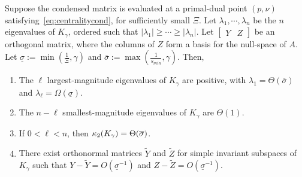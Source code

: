 \begin{theorem}
  \label{thm:cond}
  Suppose the condensed matrix is evaluated at a primal-dual
  point $(p, \nu)$ satisfying~\eqref{eq:centralitycond},
  for sufficiently small $\Xi$.
  Let $\lambda_1, \cdots, \lambda_n$ be the $n$ eigenvalues of
  $K_\gamma$, ordered such that $|\lambda_1| \geq  \cdots \geq |\lambda_n|$.
  Let $\begin{bmatrix} Y & Z \end{bmatrix}$ be an orthogonal
  matrix, where the columns of $Z$ form a basis for the null-space of
  $A$. Let $\underline{\sigma} :=\min\left(\frac{1}{\Xi}, \gamma\right)$
  and $\overline{\sigma} := \max\left(\frac{1}{s_{min}}, \gamma\right)$.
  Then,
  \begin{enumerate}
    \item[(i)] The $\ell$ largest-magnitude eigenvalues of $K_\gamma$ are positive,
      with $\lambda_1 = \Theta(\overline{\sigma})$ and $\lambda_{\ell} = \Omega(\underline{\sigma})$.
    \item[(ii)] The $n-\ell$ smallest-magnitude eigenvalues of $K_\gamma$
      are $\Theta(1)$.
    \item[(iii)] If $0 < \ell < n$, then $\kappa_2(K_\gamma) = \Theta(\overline{\sigma})$.
    \item[(iv)] There exist orthonormal matrices $\widetilde{Y}$ and $\widetilde{Z}$ for
      simple invariant subspaces of $K_\gamma$ such that $Y - \widetilde{Y} = O(\underline{\sigma}^{-1})$
      and $Z - \widetilde{Z} = O(\underline{\sigma}^{-1})$.
  \end{enumerate}
\end{theorem}
